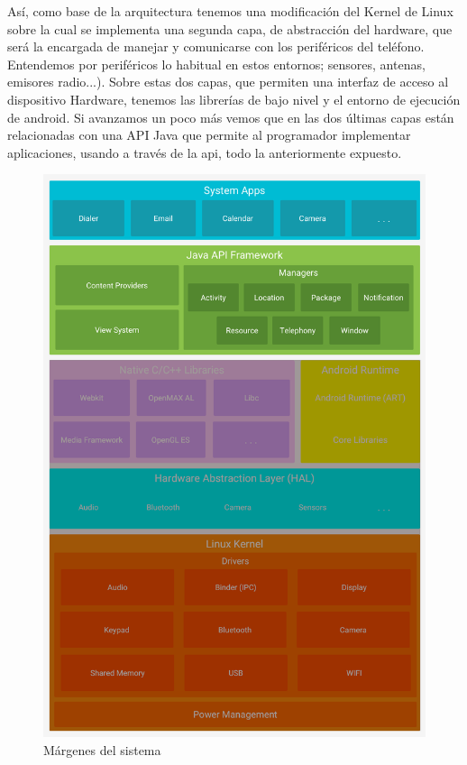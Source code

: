 \documentclass[12pt,a4paper,oneside]{book} %
\begin{document}
Así, como base de la arquitectura tenemos una modificación del Kernel de Linux sobre la cual se implementa una segunda capa, de abstracción del hardware, que será la encargada de manejar y comunicarse con los periféricos del teléfono. Entendemos por periféricos lo habitual en estos entornos; sensores, antenas, emisores radio...). Sobre estas dos capas, que permiten una interfaz de acceso al dispositivo Hardware, tenemos las librerías de bajo nivel y el entorno de ejecución de android. 
\newline \newline
Si avanzamos un poco más vemos que en las dos últimas capas están relacionadas con una API Java que permite al programador implementar aplicaciones, usando a través de la api, todo la anteriormente expuesto. 
\\
\begin{figure}[H]
	\begin{center}
		\includegraphics[scale=0.2]{pictures/architecture/android_stack_used.png} 
	\end{center}
	\caption[Detalle del Android Stack]{Márgenes del sistema}
\end{figure}
\end{document}
